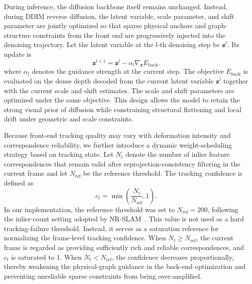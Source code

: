 \documentclass[pdflatex,sn-mathphys-num]{sn-jnl}
\begin{document}
During inference, the diffusion backbone itself remains unchanged. Instead, during DDIM reverse diffusion, the latent variable, scale parameter, and shift parameter are jointly optimized so that sparse physical anchors and graph-structure constraints from the front end are progressively injected into the denoising trajectory. Let the latent variable at the $l$-th denoising step be $\mathbf{z}^l$. Its update is
\begin{equation}
\mathbf{z}^{l+1} = \mathbf{z}^l - \alpha_l \nabla_{\mathbf{z}} E_{\mathrm{back}}.
\label{eq:latent}
\end{equation}
where $\alpha_l$ denotes the guidance strength at the current step. The objective $E_{\mathrm{back}}$ is evaluated on the dense depth decoded from the current latent variable $\mathbf{z}^l$ together with the current scale and shift estimates. The scale and shift parameters are optimized under the same objective. This design allows the model to retain the strong visual prior of diffusion while constraining structural flattening and local drift under geometric and scale constraints.

Because front-end tracking quality may vary with deformation intensity and correspondence reliability, we further introduce a dynamic weight-scheduling strategy based on tracking state. Let $N_t$ denote the number of inlier feature correspondences that remain valid after reprojection-consistency filtering in the current frame and let $N_{\mathrm{ref}}$ be the reference threshold. The tracking confidence is defined as
\begin{equation}
c_t = \min\left(\frac{N_t}{N_{\mathrm{ref}}}, 1\right).
\label{eq:confidence}
\end{equation}
In our implementation, the reference threshold was set to $N_{\mathrm{ref}}=200$, following the inlier-count setting adopted by NR-SLAM~\cite{bib9}. This value is not used as a hard tracking-failure threshold. Instead, it serves as a saturation reference for normalizing the frame-level tracking confidence. When $N_t\geq N_{\mathrm{ref}}$, the current frame is regarded as providing sufficiently rich and reliable correspondences, and $c_t$ is saturated to 1. When $N_t<N_{\mathrm{ref}}$, the confidence decreases proportionally, thereby weakening the physical-graph guidance in the back-end optimization and preventing unreliable sparse constraints from being over-amplified.
\end{document}
